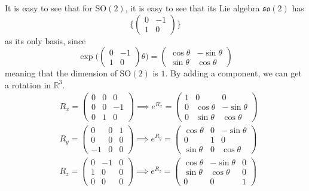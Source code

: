 \documentclass{article}
\begin{document}
    It is easy to see that for SO$(2)$, it is easy to see that its Lie algebra $\mathfrak{so}(2)$ has 
    \begin{equation}
      \bigg\{ \begin{pmatrix}
      0&-1\\1&0
      \end{pmatrix}\bigg\}
    \end{equation}
    as its only basis, since 
    \begin{equation}
      \exp  \bigg( \begin{pmatrix}
      0&-1\\1&0
      \end{pmatrix} \theta \bigg) = \begin{pmatrix}
      \cos{\theta} & - \sin{\theta} \\
      \sin{\theta} & \cos{\theta}
      \end{pmatrix}
    \end{equation}
    meaning that the dimension of SO$(2)$ is $1$. By adding a component, we can get a rotation in $\mathbb{R}^3$. 
    \begin{align*}
      & R_x = \begin{pmatrix}0&0&0\\0&0&-1\\0&1&0\end{pmatrix} \implies e^{R_x} = \begin{pmatrix}
      1&0&0\\ 0&\cos{\theta}&-\sin{\theta}\\0&\sin{\theta}&\cos{\theta}
      \end{pmatrix}\\
      & R_y = \begin{pmatrix}0&0&1\\0&0&0\\-1&0&0\end{pmatrix} \implies e^{R_y} = \begin{pmatrix}
      \cos{\theta} & 0 & -\sin{\theta}\\ 0&1&0 \\
      \sin{\theta}& 0 & \cos{\theta} \end{pmatrix} \\
      & R_z = \begin{pmatrix}0&-1&0\\1&0&0\\0&0&0\end{pmatrix} \implies e^{R_z} = \begin{pmatrix}
      \cos{\theta} & -\sin{\theta} & 0\\
      \sin{\theta}& \cos{\theta} & 0 \\ 0 & 0 & 1\end{pmatrix}
    \end{align*}
\end{document}
